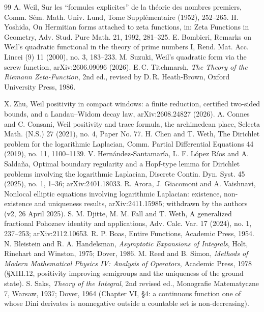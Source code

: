 \documentclass[11pt]{article}
\theoremstyle{definition}
\theoremstyle{remark}
\begin{document}
\begin{thebibliography}{99}
 A. Weil, Sur les ``formules explicites'' de la th\'eorie des nombres premiers, Comm. S\'em. Math. Univ. Lund, Tome Suppl\'ementaire (1952), 252--265.
 H. Yoshida, On Hermitian forms attached to zeta functions, in: Zeta Functions in Geometry, Adv. Stud. Pure Math. 21, 1992, 281--325.
 E. Bombieri, Remarks on Weil's quadratic functional in the theory of prime numbers I, Rend. Mat. Acc. Lincei (9) 11 (2000), no. 3, 183--233.
 M. Suzuki, Weil's quadratic form via the screw function, arXiv:2606.09096 (2026).
 E.\,C. Titchmarsh, \emph{The Theory of the Riemann Zeta-Function}, 2nd ed., revised by D.\,R. Heath-Brown, Oxford University Press, 1986.

 X. Zhu, Weil positivity in compact windows: a finite reduction, certified two-sided bounds, and a Landau--Widom decay law, arXiv:2608.24827 (2026).
 A. Connes and C. Consani, Weil positivity and trace formula, the archimedean place, Selecta Math. (N.S.) 27 (2021), no. 4, Paper No. 77.
 H. Chen and T. Weth, The Dirichlet problem for the logarithmic Laplacian, Comm. Partial Differential Equations 44 (2019), no. 11, 1100--1139.
 V. Hern\'andez-Santamar\'ia, L. F. L\'opez R\'ios and A. Salda\~na, Optimal boundary regularity and a Hopf-type lemma for Dirichlet problems involving the logarithmic Laplacian, Discrete Contin. Dyn. Syst. 45 (2025), no. 1, 1--36; arXiv:2401.18033.
 R. Arora, J. Giacomoni and A. Vaishnavi, Nonlocal elliptic equations involving logarithmic Laplacian: existence, non-existence and uniqueness results, arXiv:2411.15985; withdrawn by the authors (v2, 26 April 2025).
 S. M. Djitte, M. M. Fall and T. Weth, A generalized fractional Pohozaev identity and applications, Adv. Calc. Var. 17 (2024), no. 1, 237--253; arXiv:2112.10653.
 R. P. Boas, Entire Functions, Academic Press, 1954.
 N. Bleistein and R. A. Handelsman, \emph{Asymptotic Expansions of Integrals}, Holt, Rinehart and Winston, 1975; Dover, 1986.
 M. Reed and B. Simon, \emph{Methods of Modern Mathematical Physics IV: Analysis of Operators}, Academic Press, 1978 (\S XIII.12, positivity improving semigroups and the uniqueness of the ground state).
 S. Saks, \emph{Theory of the Integral}, 2nd revised ed., Monografie Matematyczne 7, Warsaw, 1937; Dover, 1964 (Chapter VI, \S4: a continuous function one of whose Dini derivates is nonnegative outside a countable set is non-decreasing).

\end{thebibliography}
\end{document}
